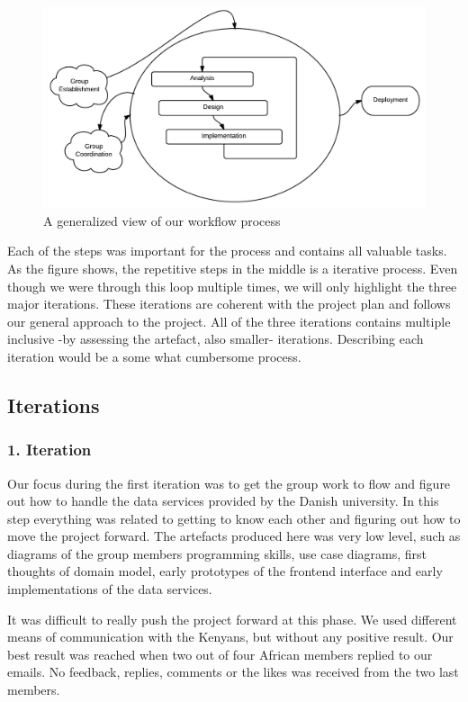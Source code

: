 \begin{figure}[ht]
\centering
\includegraphics[width=\columnwidth]{images/workflow.png}
\caption{A generalized view of our workflow process}
\label{fig:workflow}
\end{figure}

Each of the steps was important for the process and contains all valuable tasks. As the figure shows, the repetitive steps in the middle is a iterative process. Even though we were through this loop multiple times, we will only highlight the three major iterations. These iterations are coherent with the project plan and follows our general approach to the project. All of the three iterations contains multiple inclusive -by assessing the artefact, also smaller- iterations. Describing each iteration would be a some what cumbersome process.

\subsection{Iterations} \label{subsec:iterations}

\subsubsection{1. Iteration}
Our focus during the first iteration was to get the group work to flow and figure out how to handle the data services provided by the Danish university. In this step everything was related to getting to know each other and figuring out how to move the project forward. The artefacts produced here was very low level, such as diagrams of the group members programming skills, use case diagrams, first thoughts of domain model, early prototypes of the frontend interface and early implementations of the data services.

It was difficult to really push the project forward at this phase. We used different means of communication with the Kenyans, but without any positive result. Our best result was reached when two out of four African members replied to our emails. No feedback, replies, comments or the likes was received from the two last members.

